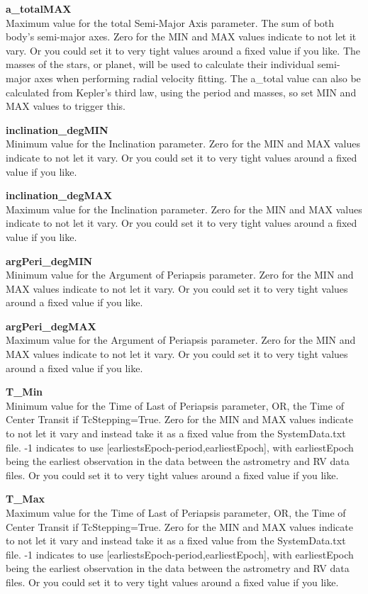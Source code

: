 \documentclass[12pt,preprint]{aastex}
\begin{document}
{\bf a\_totalMAX}\\
Maximum value for the total Semi-Major Axis parameter.  The sum of both body's semi-major axes.
Zero for the MIN and MAX values indicate to not let it vary.  Or you could set it to very tight values around a fixed value if you like.  The masses of the stars, or planet, will be used to calculate their individual semi-major axes when performing radial velocity fitting.  The a\_total value can also be calculated from Kepler's third law, using the period and masses, so set MIN and MAX values to trigger this. 

{\bf inclination\_degMIN}\\
Minimum value for the Inclination parameter.
Zero for the MIN and MAX values indicate to not let it vary.  Or you could set it to very tight values around a fixed value if you like.

{\bf inclination\_degMAX}\\
Maximum value for the Inclination parameter.
Zero for the MIN and MAX values indicate to not let it vary.  Or you could set it to very tight values around a fixed value if you like.

{\bf argPeri\_degMIN}\\
Minimum value for the Argument of Periapsis parameter.
Zero for the MIN and MAX values indicate to not let it vary.  Or you could set it to very tight values around a fixed value if you like.

{\bf argPeri\_degMAX}\\
Maximum value for the Argument of Periapsis parameter.
Zero for the MIN and MAX values indicate to not let it vary.  Or you could set it to very tight values around a fixed value if you like.

{\bf T\_Min}\\
Minimum value for the Time of Last of Periapsis parameter, OR, the Time of Center Transit if TcStepping=True.
Zero for the MIN and MAX values indicate to not let it vary and instead take it as a fixed value from the SystemData.txt file.  -1 indicates to use [earliestsEpoch-period,earliestEpoch], with earliestEpoch being the earliest observation in the data between the astrometry and RV data files.  Or you could set it to very tight values around a fixed value if you like.

{\bf T\_Max}\\
Maximum value for the Time of Last of Periapsis parameter, OR, the Time of Center Transit if TcStepping=True.
Zero for the MIN and MAX values indicate to not let it vary and instead take it as a fixed value from the SystemData.txt file.  -1 indicates to use [earliestsEpoch-period,earliestEpoch], with earliestEpoch being the earliest observation in the data between the astrometry and RV data files.  Or you could set it to very tight values around a fixed value if you like.
\end{document}
